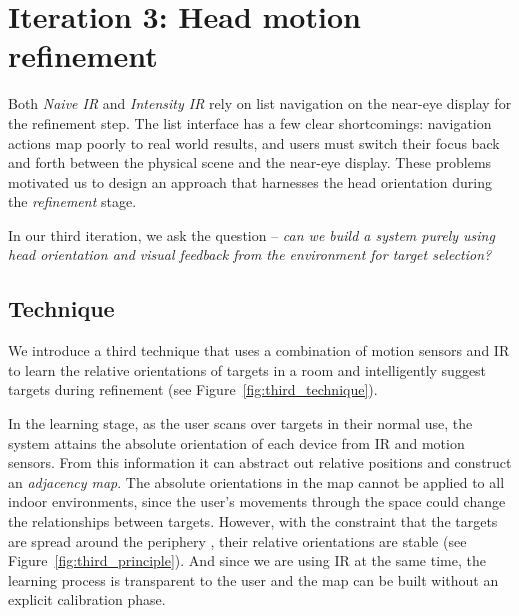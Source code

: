 \section{Iteration 3: Head motion refinement}
\label{sec:iteration-3:-head}

Both {\em Naive IR} and {\em Intensity IR} rely on list navigation on the
near-eye display for the refinement step. The list interface has a few clear
shortcomings: navigation actions map poorly to real world results, and
users must switch their focus back and forth between the physical scene and the
near-eye display. These problems motivated us to design an approach that
harnesses the head orientation during the {\em refinement} stage.

In our third iteration, we ask the  question --
{\em can we build a system purely using head orientation and visual
  feedback from the environment for target selection?}

\subsection{Technique}

We introduce a third technique that uses a combination of motion sensors and IR
to learn the relative orientations of targets in a room and intelligently
suggest targets during refinement (see Figure~\ref{fig:third_technique}).

In the learning stage, as the user scans over targets in their normal
use, the system attains the absolute orientation of each device from
IR and motion sensors. From this information it can abstract out
 relative positions  and construct an
{\em adjacency map}. The absolute orientations in the map cannot be
applied to all indoor environments, since the user's movements through
the space could change the relationships between targets. However,
with the constraint that the targets are spread around the periphery
, their relative orientations are stable
(see Figure~\ref{fig:third_principle}). And since we are using IR at
the same time, the learning process is transparent to the user and the
map can be built without an explicit calibration phase.

